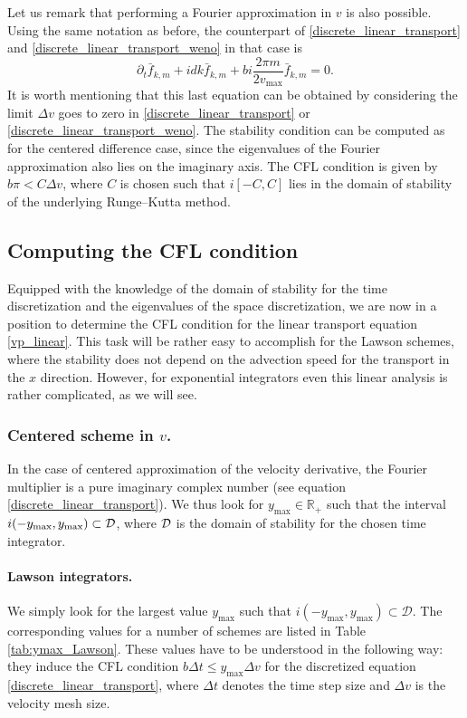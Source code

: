 {\color{black} 
\begin{remark}
Let us remark that performing a Fourier approximation in $v$ is also possible. Using the same notation as before, the counterpart of \eqref{discrete_linear_transport} and \eqref{discrete_linear_transport_weno} in that case is
$$
\partial_t \bar{f}_{k,m} + i dk\bar{f}_{k,m} +b i \frac{2\pi m}{2 v_{\max}} \bar{f}_{k,m}= 0.
$$
It is worth mentioning that this last equation can be obtained by considering the limit $\Delta v$ goes to zero in  \eqref{discrete_linear_transport} or \eqref{discrete_linear_transport_weno}. The stability condition can be computed as for the centered difference case, since the eigenvalues of the Fourier approximation also lies on the imaginary axis. The CFL condition is given by $b \pi  < C \Delta v$, where $C$ is chosen such that $i [-C,C]$ lies in the domain of stability of the underlying Runge--Kutta method. 


\end{remark}
}

\subsection{Computing the CFL condition}

Equipped with the knowledge of the domain of stability for the time discretization and the eigenvalues of the space discretization, we are now in a position to determine the CFL condition for the linear transport equation \eqref{vp_linear}. This task will be rather easy to accomplish for the Lawson schemes, where the stability does not depend on the advection speed for the transport in the $x$ direction. However, for exponential integrators even this linear analysis is rather complicated, as we will see.


\subsubsection{Centered scheme in $v$.}
In the case of centered approximation of the velocity derivative, the Fourier multiplier is a 
pure imaginary complex number (see equation \eqref{discrete_linear_transport}). We thus look for $y_{\max}\in \mathbb{R}_+$ such that the interval $i(-y_{\max},y_{\max}) \subset {\cal D}$, where ${\cal D}$ is the domain of stability for the chosen time integrator. 

\paragraph{Lawson integrators.\\} 
We simply look for the largest value $y_{\max}$ such that $i(-y_{\max}, y_{\max}) \subset \mathcal{D}$. The corresponding values for a number of schemes are listed in Table \ref{tab:ymax_Lawson}. These values have to be understood in the 
following way: they induce the CFL condition $b \Delta t\leq y_{\max}\Delta v$ for the discretized equation \eqref{discrete_linear_transport}, where $\Delta t$ denotes the time step size and $\Delta v$ is the velocity mesh size. 



